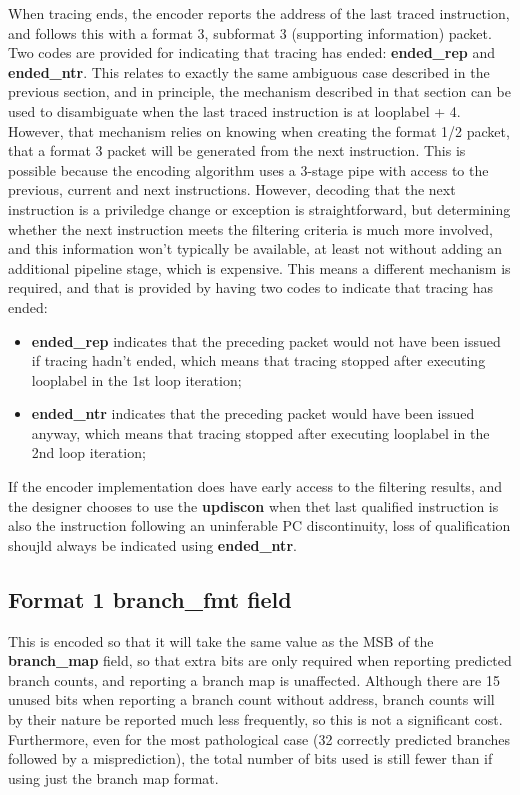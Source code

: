 When tracing ends, the encoder reports the address of the last traced instruction, and follows this with a format 3, 
subformat 3 (supporting information) packet.  Two codes are provided for indicating that tracing has ended: 
\textbf{ended\_rep} and \textbf{ended\_ntr}.  This relates to exactly the same ambiguous case described in the previous
section, and in principle, the mechanism described in that section can be used to disambiguate when the last traced
instruction is at looplabel + 4.  However, that mechanism relies on knowing when creating the format 1/2 packet, that 
a format 3 packet will be generated from the next instruction.  This is possible because the encoding algorithm uses 
a 3-stage pipe with access to the previous, current and next instructions.  However, decoding that the next instruction
is a priviledge change or exception is straightforward, but determining whether the next instruction meets the filtering
criteria is much more involved, and this information won't typically be available, at least not without adding an
additional pipeline stage, which is expensive.  This means a different mechanism is required, and that is provided
by having two codes to indicate that tracing has ended:

\begin{itemize}
  \item \textbf{ended\_rep} indicates that the preceding packet would not have been issued if tracing hadn't ended, 
    which means that tracing stopped after executing looplabel in the 1st loop iteration;
  \item \textbf{ended\_ntr} indicates that the preceding packet would have been issued anyway, 
    which means that tracing stopped after executing looplabel in the 2nd loop iteration;
\end{itemize}

If the encoder implementation does have early access to the filtering results, and the designer chooses to use the
\textbf{updiscon} when thet last qualified instruction is also the instruction following an uninferable PC discontinuity,
loss of qualification shoujld always be indicated using \textbf{ended\_ntr}.

\subsection{Format 1 \textbf{branch\_fmt} field}

This is encoded so that it will take the same value as the MSB of the \textbf{branch\_map} field, so that extra bits are
only required when reporting predicted branch counts, and reporting a branch map is unaffected.  Although there are 15
unused bits when reporting a branch count without address, branch counts will by their nature be reported much less 
frequently, so this is not a significant cost.  Furthermore, even for the most pathological case (32 correctly predicted 
branches followed by a misprediction), the total number of bits used is still fewer than if using just the branch map
format.
